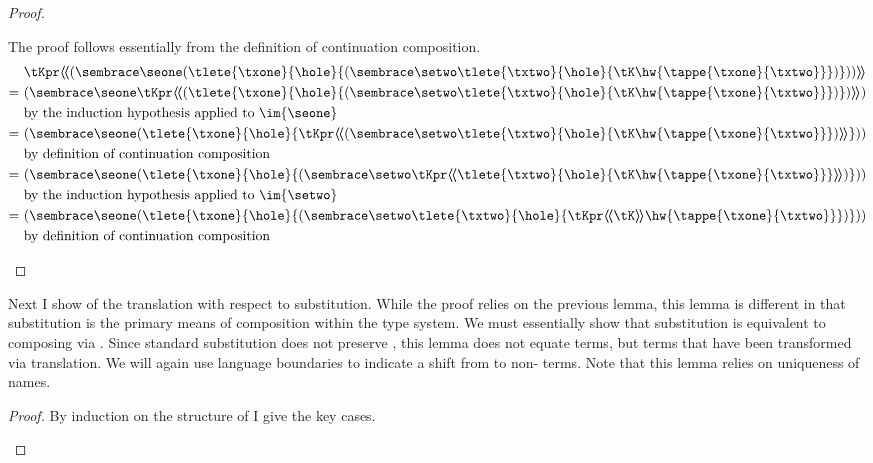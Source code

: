 {\begin{proof}
\begin{proofcases}
      The proof follows essentially from the definition of continuation composition.
      \begin{align}
        & \tKpr\hhw{(\anf{\seone}{(\tlete{\txone}{\hole}{(\anf{\setwo}{\tlete{\txtwo}{\hole}{\tK\hw{\tappe{\txone}{\txtwo}}}})})})} \nonumber \\
        =~& (\anf{\seone}{\tKpr\hhw{(\tlete{\txone}{\hole}{(\anf{\setwo}{\tlete{\txtwo}{\hole}{\tK\hw{\tappe{\txone}{\txtwo}}}})})}}) \\
        & \text{by the induction hypothesis applied to \im{\seone}} \nonumber \\
        =~& (\anf{\seone}{(\tlete{\txone}{\hole}{\tKpr\hhw{(\anf{\setwo}{\tlete{\txtwo}{\hole}{\tK\hw{\tappe{\txone}{\txtwo}}}})}})}) \\
        & \text{by definition of continuation composition} \nonumber \\
        =~ & (\anf{\seone}{(\tlete{\txone}{\hole}{(\anf{\setwo}{\tKpr\hhw{\tlete{\txtwo}{\hole}{\tK\hw{\tappe{\txone}{\txtwo}}}}})})}) \\
        & \text{by the induction hypothesis applied to \im{\setwo}} \nonumber \\
        =~ & (\anf{\seone}{(\tlete{\txone}{\hole}{(\anf{\setwo}{\tlete{\txtwo}{\hole}{\tKpr\hhw\tK\hw{\tappe{\txone}{\txtwo}}}})})}) \\
        & \text{by definition of continuation composition} \nonumber \qedhere
      \end{align}
  \end{proofcases}
\end{proof}

Next I show  of the translation with respect to
substitution.
While the proof relies on the previous lemma, this lemma is different in that
substitution is the primary means of composition within the type system.
We must essentially show that substitution is equivalent to composing via
.
Since standard substitution does not preserve , this lemma does not
equate \tlang terms, but \slang terms that have been transformed via 
translation.
We will again use language boundaries to indicate a shift from  to
non- terms.
Note that this lemma relies on uniqueness of names.
\begin{lemma}[Substitution]
  \label{lem:anf:subst}
  \im{\anf{\subst{\se}{\sepr}{\sx}}{\tK} \equiv \sbound{\subst{(\anf{\se}{\tK})}{\anfh{\sepr}}{\tx}}}
\end{lemma}
\begin{proof}
  By induction on the structure of \im{\se}
  I give the key cases.
  \begin{proofcases}
    \item \im{\se = \sx}


\end{proofcases}
\end{proof}}
